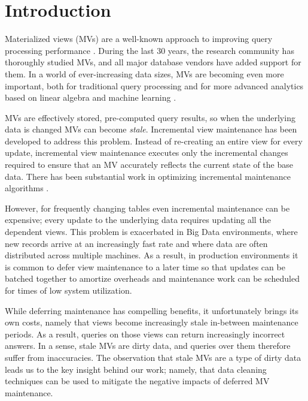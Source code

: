 \vspace{-0.5em}
\section{Introduction}
Materialized views (MVs) are a well-known approach to improving query processing performance \cite{LarsonY85, gupta1995maintenance, chirkova2011materialized, halevy2001answering}.
During the last 30 years, the research community has thoroughly studied MVs, and all major database vendors have added support for them.
In a world of ever-increasing data sizes, MVs are becoming even more important, both for traditional query processing
 \cite{lefevre2014opportunistic, bailis2014scalable, perez2014history} and for more advanced analytics based on linear algebra and machine learning \cite{nikolic2014linview, zhang2014mat}.

MVs are effectively stored, pre-computed query results, so when the underlying data is changed MVs can become \emph{stale}. 
Incremental view maintenance has been developed to address this problem\cite{gupta1995maintenance, chirkova2011materialized}. 
Instead of re-creating an entire view for every update, incremental view maintenance executes only the incremental changes required to ensure that an MV accurately reflects the current state of the base data.  
There has been substantial work in optimizing incremental maintenance algorithms \cite{DBLP:conf/sigmod/GriffinL95, griffin1997improved, samtani1999self, DBLP:conf/sac/TrutaC07, DBLP:journals/vldb/KochAKNNLS14}.
 
However, for frequently changing tables even incremental maintenance can be expensive; every update to the underlying data requires updating all the dependent views.  
This problem is exacerbated in Big Data environments, where new records arrive at an increasingly fast rate and where data are often 
distributed across multiple machines.  
As a result, in production environments it is common to defer view maintenance to a later time \cite{chirkova2011materialized, zhou2007lazy, DBLP:conf/sigmod/ColbyGLMT96} so that updates can be batched together to amortize overheads and maintenance work can be scheduled for times of low system utilization.  

While deferring maintenance has compelling benefits, it unfortunately brings its own costs, namely that views become increasingly stale in-between maintenance periods. 
As a result, queries on those views can return increasingly incorrect answers.  
In a sense, stale MVs are dirty data, and queries over them therefore suffer from inaccuracies.   
The observation that stale MVs are a type of dirty data leads us to the key insight behind our work; namely, that data cleaning techniques can be used to mitigate the negative impacts of deferred MV maintenance.  

